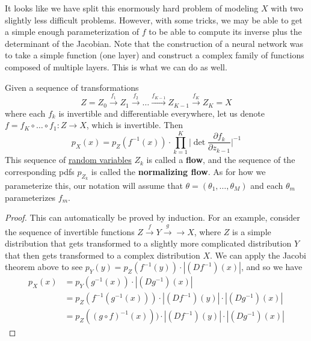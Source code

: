 \documentclass{article}
\begin{document}
  It looks like we have split this enormously hard problem of modeling $X$ with two slightly less difficult problems. However, with some tricks, we may be able to get a simple enough parameterization of $f$ to be able to compute its inverse plus the determinant of the Jacobian. Note that the construction of a neural network was to take a simple function (one layer) and construct a complex family of functions composed of multiple layers. This is what we can do as well. 

  \begin{corollary}
    \label{thm:finite-normalizing-flow}
    Given a sequence of transformations 
    \begin{equation}
      Z = Z_0 \xrightarrow{f_1} Z_1 \xrightarrow{f_2} \ldots \xrightarrow{f_{K-1}} Z_{K-1} \xrightarrow{f_K} Z_K = X
    \end{equation} 
    where each $f_k$ is invertible and differentiable everywhere, let us denote $f = f_K \circ \ldots \circ f_1: Z \rightarrow X$, which is invertible. Then
    \begin{equation}
      p_X (x) = p_Z (f^{-1} (x)) \cdot \prod_{k=1}^K \bigg| \det \frac{\partial f_k}{ \partial z_{k-1}} \bigg|^{-1}
    \end{equation}
    This sequence of \hyperref[prob-def:random-variable]{random variables} $Z_k$ is called a \textbf{flow}, and the sequence of the corresponding pdfs $p_{Z_k}$ is called the \textbf{normalizing flow}. As for how we parameterize this, our notation will assume that $\theta = (\theta_1, \ldots, \theta_M)$ and each $\theta_m$ parameterizes $f_m$.
  \end{corollary} 
  \begin{proof}
    This can automatically be proved by induction. For an example, consider the sequence of invertible functions $Z \xrightarrow{f} Y \xrightarrow{g} \rightarrow X$, where $Z$ is a simple distribution that gets transformed to a slightly more complicated distribution $Y$ that then gets transformed to a complex distribution $X$. We can apply the Jacobi theorem above to see $p_Y (y) = p_Z (f^{-1} (y)) \cdot | (Df^{-1})(x)|$, and so we have 
    \begin{align}
      p_X (x) & = p_Y (g^{-1} (x)) \cdot | (D g^{-1}) (x) | \\
              & = p_Z (f^{-1} (g^{-1} (x))) \cdot | (Df^{-1}) (y)| \cdot | (D g^{-1}) (x) | \\ 
              & = p_Z ((g \circ f)^{-1} (x))) \cdot | (Df^{-1}) (y)| \cdot | (D g^{-1}) (x) | 
    \end{align}
  \end{proof}
\end{document}
